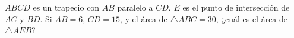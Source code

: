 $ABCD$ es un trapecio con $AB$ paralelo a $CD$. $E$ es el punto de intersección de $AC$ y $BD$. Si $AB=6$, $CD=15$, y el área de $\triangle ABC = 30$, ¿cuál es el área de $\triangle AEB$?
